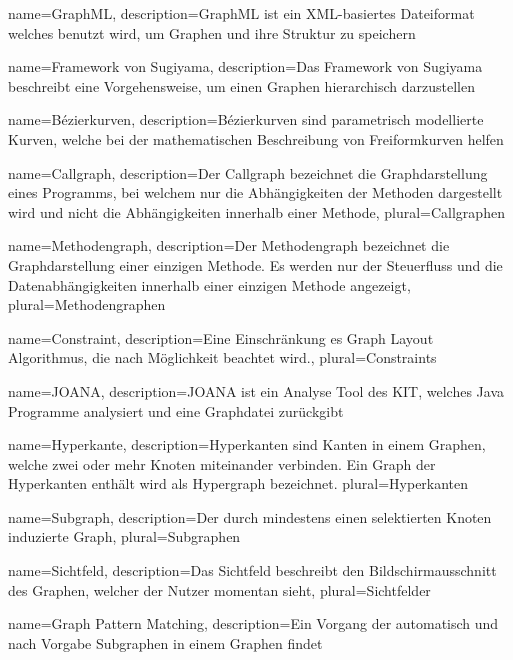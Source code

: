 {
  name=GraphML,
  description={GraphML ist ein XML-basiertes Dateiformat welches benutzt wird, um Graphen und ihre Struktur zu speichern}
}

{
  name=Framework von Sugiyama,
  description={Das Framework von Sugiyama beschreibt eine Vorgehensweise, um einen Graphen hierarchisch darzustellen}
}

{
  name=Bézierkurven,
  description={Bézierkurven sind parametrisch modellierte Kurven, welche bei der mathematischen Beschreibung von Freiformkurven helfen}
}

{
  name=Callgraph,
  description={Der Callgraph bezeichnet die Graphdarstellung eines Programms, bei welchem nur die Abhängigkeiten der Methoden dargestellt wird und nicht die Abhängigkeiten innerhalb einer Methode},
  plural=Callgraphen
}

{
  name=Methodengraph,
  description={Der Methodengraph bezeichnet die Graphdarstellung einer einzigen Methode. Es werden nur der Steuerfluss und die Datenabhängigkeiten innerhalb einer einzigen Methode angezeigt},
  plural=Methodengraphen
}

{
  name=Constraint,
  description={Eine Einschränkung es Graph Layout Algorithmus, die nach Möglichkeit beachtet wird.},
  plural=Constraints
}

{
  name=JOANA,
  description={JOANA ist ein Analyse Tool des KIT, welches Java Programme analysiert und eine Graphdatei zurückgibt}
}

{
  name=Hyperkante,
  description={Hyperkanten sind Kanten in einem Graphen, welche zwei oder mehr Knoten miteinander verbinden. Ein Graph der Hyperkanten enthält wird als Hypergraph bezeichnet.}
  plural=Hyperkanten
}

{
  name=Subgraph,
  description={Der durch mindestens einen selektierten Knoten induzierte Graph},
  plural=Subgraphen
}

{
	name=Sichtfeld,
	description={Das Sichtfeld beschreibt den Bildschirmausschnitt des Graphen, welcher der Nutzer momentan sieht},
  plural=Sichtfelder
}

{
  name=Graph Pattern Matching,
  description={Ein Vorgang der automatisch und nach Vorgabe Subgraphen in einem Graphen findet}
}

